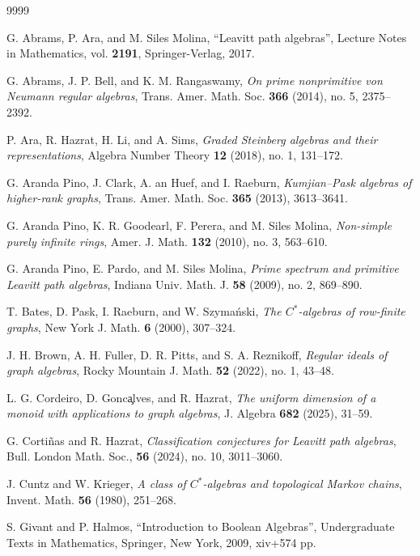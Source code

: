 \documentclass[a4paper,reqno,12pt]{amsart}
\numberwithin{equation}{section}
\theoremstyle{definition}
\theoremstyle{remark}
\begin{document}
\begin{thebibliography}{9999}

G. Abrams, P. Ara, and M. Siles Molina, ``Leavitt path algebras'', Lecture Notes in Mathematics, vol. \textbf{2191}, Springer-Verlag, 2017. 

G. Abrams, J. P. Bell, and K. M. Rangaswamy, \emph{On prime nonprimitive von Neumann regular algebras}, Trans. Amer. Math. Soc. \textbf{366} (2014), no. 5, 2375--2392.

P. Ara, R. Hazrat, H. Li, and A. Sims, \emph{Graded Steinberg algebras and their representations}, Algebra Number Theory {\bf 12} (2018), no. 1, 131--172.

G. Aranda Pino, J. Clark, A. an Huef, and I. Raeburn, \emph{Kumjian--Pask algebras of higher-rank graphs}, Trans. Amer. Math. Soc. \textbf{365} (2013), 3613--3641.

G. Aranda Pino, K. R. Goodearl, F. Perera, and M. Siles Molina, \emph{Non-simple purely infinite rings}, Amer. J. Math. \textbf{132} (2010), no. 3, 563--610.

G. Aranda Pino, E. Pardo, and M. Siles Molina, \emph{Prime spectrum and primitive Leavitt path algebras}, Indiana Univ. Math. J. \textbf{58} (2009), no. 2, 869--890.

T. Bates, D. Pask, I. Raeburn, and W. Szyma\'{n}ski, \emph{The $C^*$-algebras of row-finite graphs}, New York J. Math. \textbf{6} (2000), 307--324.

J. H. Brown, A. H. Fuller, D. R. Pitts, and S. A. Reznikoff, \emph{Regular ideals of graph algebras}, Rocky Mountain J. Math. \textbf{52} (2022), no. 1, 43--48. 

L. G. Cordeiro, D. Gonc\c alves, and R. Hazrat, \emph{The uniform dimension of a monoid with applications to graph algebras}, J. Algebra \textbf{682} (2025), 31--59.

G. Corti\~nas and R. Hazrat, \emph{Classification conjectures for Leavitt path algebras},  Bull. London Math. Soc., {\bf 56} (2024), no. 10, 3011--3060.

J. Cuntz and W. Krieger, \emph{A class of $C^*$-algebras and topological Markov chains}, Invent. Math. {\bf 56} 
(1980), 251--268.

S. Givant and P. Halmos, ``Introduction to Boolean Algebras'', Undergraduate Texts in Mathematics, Springer, New York, 2009, xiv+574 pp.


\end{thebibliography}
\end{document}
